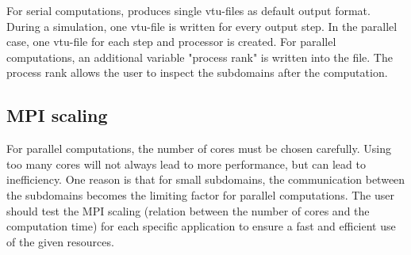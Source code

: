 For serial computations, \Dumux produces single vtu-files as default output format. 
During a simulation, one vtu-file is written for every output step. 
In the parallel case, one vtu-file for each step and processor is created. 
For parallel computations, an additional variable "process rank" is written 
into the file. The process rank allows the user to inspect the subdomains 
after the computation.

\subsection{MPI scaling}
For parallel computations, the number of cores must be chosen 
carefully. Using too many cores will not always lead to more performance, but 
can lead to inefficiency. One reason is that for small subdomains, the 
communication between the subdomains becomes the limiting factor for parallel computations. 
The user should test the MPI scaling (relation between the number of cores and the computation time) 
for each specific application to ensure a fast and efficient use of the given resources.   
